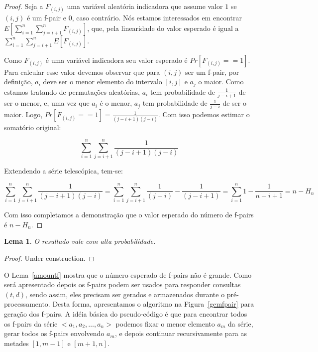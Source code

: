 \documentclass[12pt]{article}
\newtheorem{lem}[thm]{Lema}
\begin{document}
\begin{proof}
Seja a $F_{(i, j)}$ uma variável aleatória indicadora que assume valor
$1$ se $(i, j)$ é um f-pair e $0$, caso contrário. Nós estamos interessados
em encontrar $E[\sum_{i = 1}^n \sum_{j=i + 1}^n F_{(i, j)}]$, que, pela linearidade
do valor esperado é igual a $\sum_{i = 1}^n \sum_{j = i + 1}^n E[F_{(i, j)}]$.  

Como $F_{(i, j)}$ é uma variável indicadora seu valor esperado é $Pr[F_{(i,j)} == 1]$.
Para calcular esse valor devemos observar que para $(i, j)$ ser um f-pair, por definição,
$a_i$ deve ser o menor elemento do intervalo $[i, j]$ e $a_j$ o maior. Como estamos
tratando de permutações aleatórias, $a_i$ tem probabilidade de $\frac{1}{j - i + 1}$ de
ser o menor, e, uma vez que $a_i$ é o menor, $a_j$ tem probabilidade de $\frac{1}{j - i}$ de
ser o maior. Logo, $Pr[F_{(i, j)} == 1] = \frac{1}{(j - i + 1) (j - i)}$. Com isso podemos
estimar o somatório original:

$$\sum_{i = 1}^n \sum_{j = i + 1}^n  \frac{1}{(j - i + 1) (j - i)}$$

Extendendo a série telescópica, tem-se:

$$\sum_{i = 1}^n \sum_{j = i + 1}^n  \frac{1}{(j - i + 1) (j - i)} = \sum_{i = 1}^n \sum_{j = i + 1}^n  \frac{1}{(j - i)} - \frac{1}{(j - i + 1)} = \sum_{i = 1}^n 1 - \frac{1}{n - i + 1} = n - H_n $$

Com isso completamos a demonstração que o valor esperado do número de f-pairs é $n - H_n$.
\end{proof}

\begin{lem}
O resultado vale com alta probabilidade.
\end{lem}

\begin{proof}
Under construction.
\end{proof}

O Lema~\ref{amountf} mostra que o número esperado de f-pairs não é grande.
Como será apresentado depois os f-pairs podem ser usados para responder
consultas $(t, d)$, sendo assim, eles precisam ser gerados e armazenados
durante o pré-processamento. Desta forma, apresentamos o algoritmo na Figura~\ref{gemfpair} para geração
dos f-pairs. A idéia básica do pseudo-código é que para encontrar todos os f-pairs da
série $<a_1, a_2, \ldots, a_n>$ podemos fixar o menor elemento $a_m$ da série,
gerar todos os f-pairs envolvendo $a_m$, e depois continuar recursivamente para as metades $[1, m - 1]$ e $[m + 1, n]$.
\end{document}
